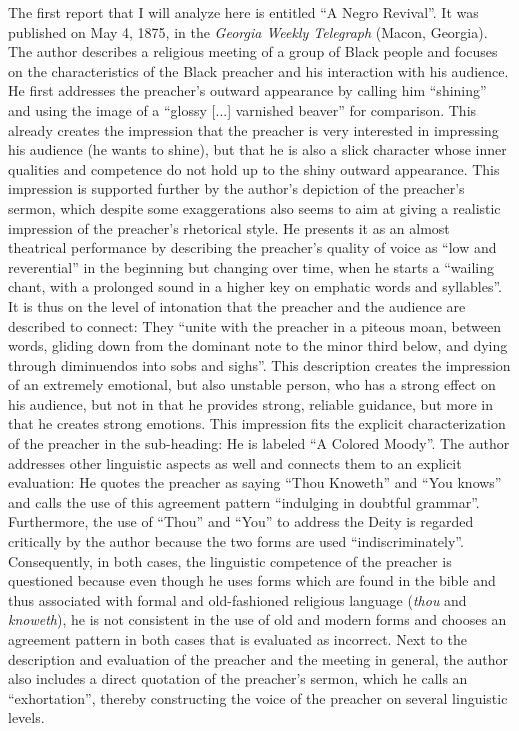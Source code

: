 The first report that I will analyze here is entitled “A Negro Revival”. It was published on May 4, 1875, in the \emph{Georgia Weekly Telegraph} (Macon, Georgia). The author describes a religious meeting of a group of Black people and focuses on the characteristics of the Black preacher and his interaction with his audience. He first addresses the preacher’s outward appearance by calling him “shining” and using the image of a “glossy [...] varnished beaver” for comparison. This already creates the impression that the preacher is very interested in impressing his audience (he wants to shine), but that he is also a slick character whose inner qualities and competence do not hold up to the shiny outward appearance. This impression is supported further by the author’s depiction of the preacher’s sermon, which despite some exaggerations also seems to aim at giving a realistic impression of the preacher’s rhetorical style. He presents it as an almost theatrical performance by describing the preacher’s quality of voice as “low and reverential” in the beginning but changing over time, when he starts a “wailing chant, with a prolonged sound in a higher key on emphatic words and syllables”. It is thus on the level of intonation that the preacher and the audience are described to connect: They “unite with the preacher in a piteous moan, between words, gliding down from the dominant note to the minor third below, and dying through diminuendos into sobs and sighs”. This description creates the impression of an extremely emotional, but also unstable person, who has a strong effect on his audience, but not in that he provides strong, reliable guidance, but more in that he creates strong emotions. This impression fits the explicit characterization of the preacher in the sub-heading: He is labeled “A Colored Moody”. The author addresses other linguistic aspects as well and connects them to an explicit evaluation: He quotes the preacher as saying “Thou Knoweth” and “You knows” and calls the use of this agreement pattern “indulging in doubtful grammar”. Furthermore, the use of “Thou” and “You” to address the Deity is regarded critically by the author because the two forms are used “indiscriminately”. Consequently, in both cases, the linguistic competence of the preacher is questioned because even though he uses forms which are found in the bible and thus associated with formal and old-fashioned religious language (\emph{thou} and \emph{knoweth}), he is not consistent in the use of old and modern forms and chooses an agreement pattern in both cases that is evaluated as incorrect. Next to the description and evaluation of the preacher and the meeting in general, the author also includes a direct quotation of the preacher’s sermon, which he calls an “exhortation”, thereby constructing the voice of the preacher on several linguistic levels.

